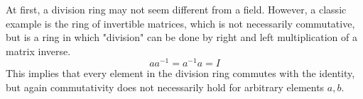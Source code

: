   \begin{example}
    At first, a division ring may not seem different from a field. However, a classic example is the ring of invertible matrices, which is not necessarily commutative, but is a ring in which "division" can be done by right and left multiplication of a matrix inverse. 
    \begin{equation}
      a a^{-1} = a^{-1} a = I
    \end{equation}
    This implies that every element in the division ring commutes with the identity, but again commutativity does not necessarily hold for arbitrary elements $a, b$. 
  \end{example} 


